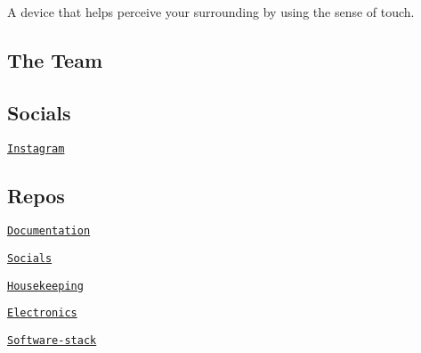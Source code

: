 A device that helps perceive your surrounding by using the sense of touch.



\subsection*{The Team}


\begin{DoxyItemize}
\item \href{https://github.com/rdj2829}{\tt }
\item \href{https://github.com/dheerajsankar}{\tt }
\item \href{https://github.com/kprakz}{\tt }
\item \href{https://github.com/josephjoel3099}{\tt }
\end{DoxyItemize}

\subsection*{Socials}


\begin{DoxyItemize}
\item \href{https://www.instagram.com/hapticvision_/}{\tt Instagram}
\end{DoxyItemize}

\subsection*{Repos}


\begin{DoxyItemize}
\item \href{https://github.com/Haptic-Vision/Documentation}{\tt Documentation}
\item \href{https://github.com/Haptic-Vision/Socials}{\tt Socials}
\item \href{https://github.com/Haptic-Vision/Housekeeping}{\tt Housekeeping}
\item \href{https://github.com/Haptic-Vision/Electronics}{\tt Electronics}
\item \href{https://github.com/Haptic-Vision/Software-stack}{\tt Software-\/stack} 
\end{DoxyItemize}
